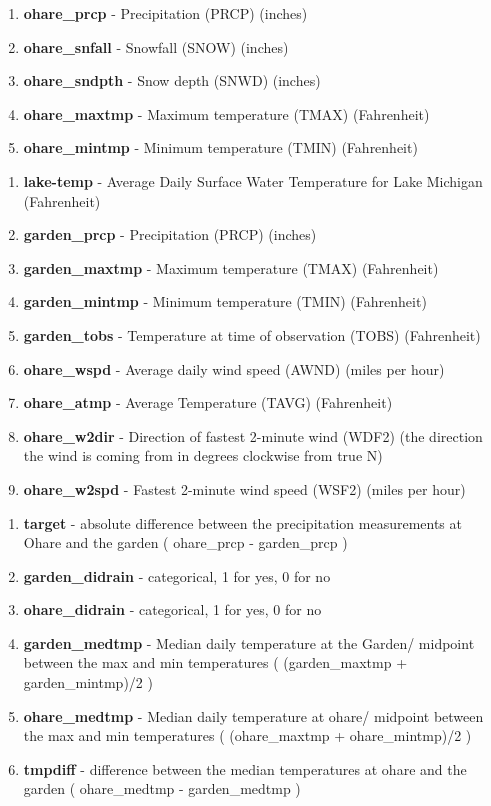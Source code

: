 \documentclass[10pt]{article}
\begin{document}
\begin{enumerate}[\null]
\begin{enumerate}
\end{enumerate}

\begin{enumerate}
 \item[] \textbf{ohare\_prcp} - Precipitation (PRCP) (inches)
 \item[] \textbf{ohare\_snfall} - Snowfall (SNOW) (inches)
 \item[] \textbf{ohare\_sndpth} - Snow depth (SNWD) (inches) 
 \item[] \textbf{ohare\_maxtmp} - Maximum temperature (TMAX) (Fahrenheit)
 \item[] \textbf{ohare\_mintmp} - Minimum temperature (TMIN) (Fahrenheit)
\end{enumerate}

\begin{enumerate}
\item[] \textbf{lake-temp} - Average Daily Surface Water Temperature for Lake Michigan 	(Fahrenheit) 
 \item[] \textbf{garden\_prcp} - Precipitation (PRCP) (inches)
 \item[] \textbf{garden\_maxtmp} - Maximum temperature (TMAX) (Fahrenheit)
 \item[] \textbf{garden\_mintmp} - Minimum temperature (TMIN) (Fahrenheit)
 \item[] \textbf{garden\_tobs} - Temperature at time of observation (TOBS) (Fahrenheit)
 \item[] \textbf{ohare\_wspd} - Average daily wind speed (AWND) (miles per hour) 
 \item[] \textbf{ohare\_atmp} - Average Temperature (TAVG) (Fahrenheit)
 \item[] \textbf{ohare\_w2dir} - Direction of fastest 2-minute wind (WDF2) (the direction the wind is coming from in degrees clockwise from true N)  
 \item[] \textbf{ohare\_w2spd} - Fastest 2-minute wind speed (WSF2) (miles per hour)
\end{enumerate}

\begin{enumerate}
 \item[] \textbf{target} - absolute difference between the precipitation measurements at Ohare and the garden ( ohare\_prcp - garden\_prcp )
 \item[] \textbf{garden\_didrain} - categorical, 1 for yes, 0 for no
 \item[] \textbf{ohare\_didrain} - categorical, 1 for yes, 0 for no
 \item[] \textbf{garden\_medtmp} - Median daily temperature at the Garden/ midpoint between the max and min temperatures ( (garden\_maxtmp + garden\_mintmp)/2 )
 \item[] \textbf{ohare\_medtmp} - Median daily temperature at ohare/ midpoint between the max and min temperatures ( (ohare\_maxtmp + ohare\_mintmp)/2 )
 \item[] \textbf{tmpdiff} - difference between the median temperatures at ohare and the garden ( ohare\_medtmp - garden\_medtmp )
 \end{enumerate}  
 

\end{enumerate}
\end{document}
